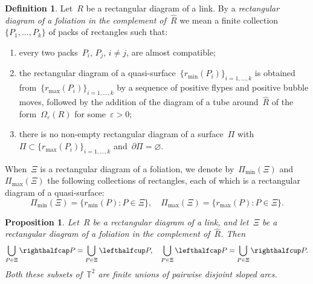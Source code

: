 \documentclass{amsart}
\def\cabl#1{\lefthalfcup#1}
\def\cabr#1{\righthalfcup#1}
\def\catl#1{\lefthalfcap#1}
\def\catr#1{\righthalfcap#1}
\theoremstyle{theorem}
\newtheorem{prop}[theo]{Proposition}
\theoremstyle{remark}
\theoremstyle{definition}
\newtheorem{defi}[theo]{Definition}
\numberwithin{equation}{section}
\numberwithin{figure}{section}
\begin{document}
\begin{defi}
Let~$R$ be a rectangular diagram of a link. By a \emph{rectangular diagram of a foliation
in the complement of~$\widehat R$} we mean a finite collection~$\{P_1,\ldots,P_k\}$
of packs of rectangles such that:
\begin{enumerate}
\item
every two packs~$P_i$, $P_j$, $i\ne j$, are almost compatible;
\item
the rectangular diagram of a quasi-surface~$\{r_{\mathrm{min}}(P_i)\}_{i=1,\ldots,k}$
is obtained from~$\{r_{\mathrm{max}}(P_i)\}_{i=1,\ldots,k}$ by a sequence
of positive flypes and positive bubble moves, followed by the addition
of the diagram of a tube around~$\widehat R$ of the form~$\Omega_\varepsilon(R)$ for some~$\varepsilon>0$;
\item
there is no non-empty rectangular diagram of a surface~$\Pi$ with~$\Pi\subset\{r_{\mathrm{max}}(P_i)\}_{i=1,\ldots,k}$
and~$\partial\Pi=\varnothing$.
\end{enumerate}
When~$\Xi$ is a rectangular diagram of a foliation, we denote by~$\Pi_{\mathrm{min}}(\Xi)$ and~$\Pi_{\mathrm{max}}(\Xi)$
the following collections of rectangles, each of which is a rectangular diagram of a quasi-surface:
$$\Pi_{\mathrm{min}}(\Xi)=\{r_{\mathrm{min}}(P):P\in\Xi\},\quad
\Pi_{\mathrm{max}}(\Xi)=\{r_{\mathrm{max}}(P):P\in\Xi\}.$$
\end{defi}

\begin{prop}\label{catr=cabl-prop}
Let~$R$ be a rectangular diagram of a link, and let~$\Xi$ be a rectangular diagram of a foliation
in the complement of~$\widehat R$. Then
$$\bigcup_{P\in\Xi}\catr P=\bigcup_{P\in\Xi}\cabl P,\quad
\bigcup_{P\in\Xi}\catl P=\bigcup_{P\in\Xi}\cabr P.$$
Both these subsets of~$\mathbb T^2$ are finite unions of pairwise disjoint sloped arcs.
\end{prop}
\end{document}
